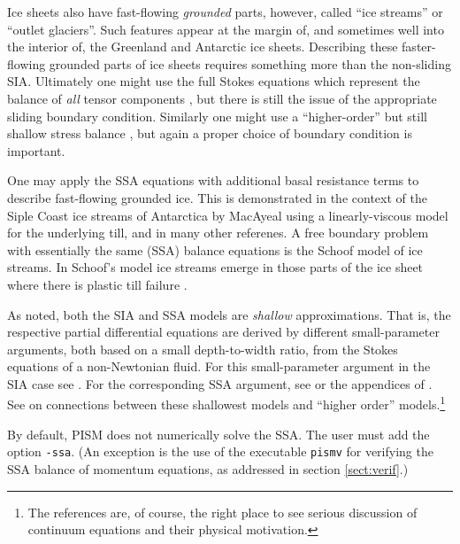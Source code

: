 \documentclass[11pt,final]{amsart}
\newcommand{\pismoptionindex}[1]{\index{options for PISM (and PETSc)!\texttt{-#1}}}
\newcommand{\intextoption}[1]{\texttt{-#1}\pismoptionindex{#1}}
\begin{document}
Ice sheets also have fast-flowing \emph{grounded} parts, however, called ``ice streams'' or ``outlet glaciers''.  Such features appear at the margin of, and sometimes well into the interior of, the Greenland \cite{Joughinetal2001} and Antarctic \cite{BamberVaughanJoughin} ice sheets.  Describing these faster-flowing grounded parts of ice sheets requires something more than the non-sliding SIA.  Ultimately one might use the full Stokes equations which represent the balance of \emph{all} tensor components \cite{Fowler}, but there is still the issue of the appropriate sliding boundary condition.  Similarly one might use a ``higher-order'' but still shallow stress balance \cite{Blatter,Pattyn03}, but again a proper choice of boundary condition is important.

One may apply the SSA equations with additional basal resistance terms to describe fast-flowing grounded ice.  This is demonstrated in the context of the Siple Coast ice streams of Antarctica by MacAyeal \cite{MacAyeal,HulbeMacAyeal} using a linearly-viscous model for the underlying till, and in many other referenes.  A free boundary problem with essentially the same (SSA) balance equations is the Schoof \cite{SchoofStream} model of ice streams.  In Schoof's model ice streams emerge in those parts of the ice sheet where there is plastic till failure \cite{Paterson}.

As noted, both the SIA and SSA models are \emph{shallow} approximations.  That is, the respective partial differential equations are derived by different small-parameter arguments, both based on a small depth-to-width ratio, from the Stokes equations of a non-Newtonian fluid.  For this small-parameter argument in the SIA case see \cite{Fowler}.  For the corresponding SSA argument, see \cite{WeisGreveHutter} or the appendices of \cite{SchoofStream}.  See \cite{SchoofHindmarsh} on connections between these shallowest models and ``higher order'' models.\footnote{The references are, of course, the right place to see serious discussion of continuum equations and their physical motivation.}

By default, PISM does not numerically solve the SSA.  The user must add the option \intextoption{ssa}.  (An exception is the use of the executable \verb|pismv| for verifying the SSA balance of momentum equations, as addressed in section \ref{sect:verif}.)
\end{document}
